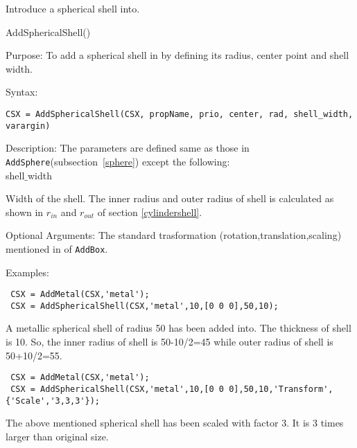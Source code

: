 Introduce a spherical shell into\hyperref[CSX]{}. 

\begin{FontNameFunct}{AddSphericalShell()}
\end{FontNameFunct}

\begin{FontDescr}{Purpose:}
To add a spherical shell in\hyperref[CSX]{} by defining its radius, center point and shell width. 
\end{FontDescr}

\begin{FontDescr}{Syntax:}
\begin{lstlisting}
CSX = AddSphericalShell(CSX, propName, prio, center, rad, shell_width, varargin) 
\end{lstlisting}
\end{FontDescr}

\begin{FontDescr}{Description:}
The parameters are defined same as those in \texttt{AddSphere}(subsection~\ref{sphere}) except the following: \\
\textcolor{varcol}{shell$\_$width}
\begin{myindentpar} Width of the shell. The inner radius and outer radius of shell is calculated as shown in \hyperref[rin]{$r_{in}$} and \hyperref[rout]{$r_{out}$} of section \ref{cylindershell}.
\end{myindentpar} 
\end{FontDescr}

\begin{FontDescr}{Optional Arguments:}
The standard trasformation (rotation,translation,scaling) mentioned in  \hyperref[prim_transform]{} of \texttt{AddBox}.   
\end{FontDescr}

\begin{FontDescr}{Examples:}

\begin{lstlisting} 
 CSX = AddMetal(CSX,'metal'); 
 CSX = AddSphericalShell(CSX,'metal',10,[0 0 0],50,10);
\end{lstlisting}
A metallic spherical shell of radius 50 has been added into\hyperref[CSX]{}. The thickness of shell is 10. So, the inner radius of shell is 50-10/2=45 while outer radius of shell is 50+10/2=55.   

\begin{lstlisting} 
 CSX = AddMetal(CSX,'metal'); 
 CSX = AddSphericalShell(CSX,'metal',10,[0 0 0],50,10,'Transform',{'Scale','3,3,3'});
\end{lstlisting}
The above mentioned spherical shell has been scaled with factor 3. It is 3 times larger than original size. 

\end{FontDescr}